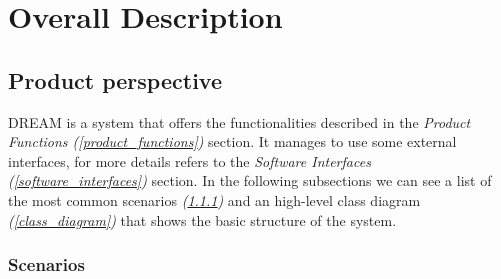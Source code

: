 \documentclass[table, 12pt]{article}
\begin{document}
\section{Overall Description}
\subsection{Product perspective}
DREAM is a system that offers the functionalities described in the \textit{Product Functions (\ref{product_functions})} section.
It manages to use some external interfaces, for more details refers to the \textit{Software Interfaces (\ref{software_interfaces})} section.
In the following subsections we can see a list of the most common scenarios \textit{(\ref{scenarios})} and an high-level class diagram \textit{(\ref{class_diagram})} that shows the basic structure of the system.
\subsubsection{Scenarios}
\label{scenarios}
\end{document}
